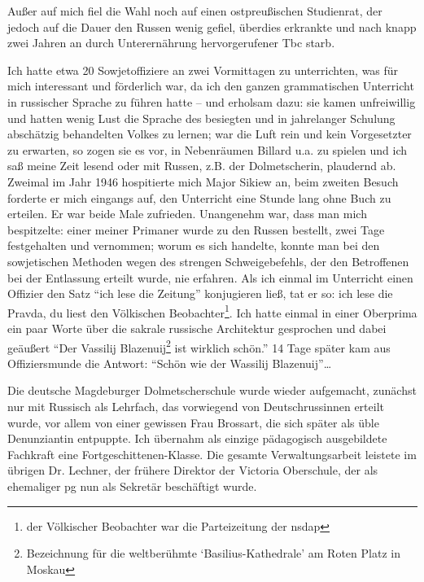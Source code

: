 Außer auf mich fiel die Wahl noch auf einen ostpreußischen Studienrat, der jedoch auf die Dauer den Russen wenig gefiel, überdies erkrankte und nach knapp zwei Jahren an durch Unterernährung hervorgerufener Tbc starb.

Ich hatte etwa 20 Sowjetoffiziere an zwei Vormittagen zu unterrichten, was für mich interessant und förderlich war, da ich den ganzen grammatischen Unterricht in russischer Sprache zu führen hatte -- und erholsam dazu: sie kamen unfreiwillig und hatten wenig Lust die Sprache des besiegten und in jahrelanger Schulung abschätzig behandelten Volkes zu lernen; war die Luft rein und kein Vorgesetzter zu erwarten, so zogen sie es vor, in Nebenräumen Billard u.a. zu spielen und ich saß meine Zeit lesend oder mit Russen, z.B. der Dolmetscherin, plaudernd ab. Zweimal im Jahr 1946 hospitierte mich Major Sikiew an, beim zweiten Besuch forderte er mich eingangs auf, den Unterricht eine Stunde lang ohne Buch zu erteilen. Er war beide Male zufrieden. Unangenehm war, dass man mich bespitzelte: einer meiner Primaner wurde zu den Russen bestellt, zwei Tage festgehalten und vernommen; worum es sich handelte, konnte man bei den sowjetischen Methoden wegen des strengen Schweigebefehls, der den Betroffenen bei der Entlassung erteilt wurde, nie erfahren. Als ich einmal im Unterricht einen Offizier den Satz \enquote{ich lese die Zeitung} konjugieren ließ, tat er so: ich lese die Pravda, du liest den Völkischen Beobachter\footnote{der Völkischer Beobachter war die Parteizeitung der \ac{nsdap}}.  Ich hatte einmal in einer Oberprima ein paar Worte über die sakrale russische Architektur gesprochen und dabei geäußert \enquote{Der Vassilij Blazenuij\footnote{Bezeichnung für die weltberühmte \enquote{Basilius-Kathedrale} am Roten Platz in Moskau} ist wirklich schön.} 14 Tage später kam aus Offiziersmunde die Antwort: \enquote{Schön wie der Wassilij Blazenuij}\dots

Die deutsche Magdeburger Dolmetscherschule wurde wieder aufgemacht, zunächst nur mit Russisch als Lehrfach, das vorwiegend von Deutschrussinnen erteilt wurde, vor allem von einer gewissen Frau Brossart, die sich später als üble Denunziantin entpuppte. Ich übernahm als einzige pädagogisch ausgebildete Fachkraft eine Fortgeschittenen-Klasse. Die gesamte Verwaltungsarbeit leistete im übrigen Dr. Lechner, der frühere Direktor der Victoria Oberschule, der als ehemaliger \ac{pg} nun als Sekretär beschäftigt wurde.

